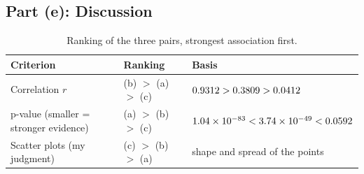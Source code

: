 \documentclass[11pt]{article}
\begin{document}
\subsection{Part (e): Discussion}

\begin{table}[H]
  \centering
  \caption{Ranking of the three pairs, strongest association first.}
  \label{tab:rank}
  \begin{tabular}{lll}
    \toprule
    Criterion & Ranking & Basis \\
    \midrule
    Correlation $r$ & (b) $>$ (a) $>$ (c) & $0.9312 > 0.3809 > 0.0412$ \\
    \midrule
    p-value (smaller = stronger evidence) & (a) $>$ (b) $>$ (c) & $1.04\times 10^{-83} < 3.74\times 10^{-49} < 0.0592$ \\
    \midrule
    Scatter plots (my judgment) & (c) $>$ (b) $>$ (a) & shape and spread of the points \\
    \bottomrule
  \end{tabular}
\end{table}
\end{document}
